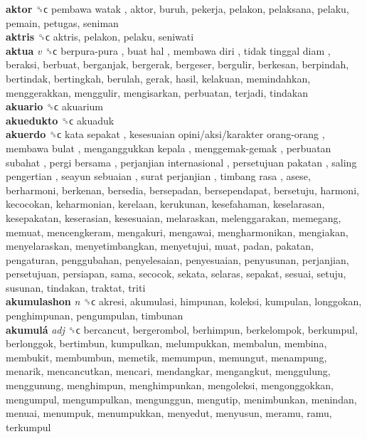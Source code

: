 \textbf{aktor} ␝ϲ   pembawa watak , aktor, buruh, pekerja, pelakon, pelaksana, pelaku, pemain, petugas, seniman  \\
\textbf{aktris} ␝ϲ  aktris, pelakon, pelaku, seniwati  \\
\textbf{aktua} \emph{v}  ␝ϲ   berpura-pura ,  buat hal ,  membawa diri ,  tidak tinggal diam , beraksi, berbuat, berganjak, bergerak, bergeser, bergulir, berkesan, berpindah, bertindak, bertingkah, berulah, gerak, hasil, kelakuan, memindahkan, menggerakkan, menggulir, mengisarkan, perbuatan, terjadi, tindakan  \\
\textbf{akuario} ␝ϲ  akuarium  \\
\textbf{akuedukto} ␝ϲ  akuaduk  \\
\textbf{akuerdo} ␝ϲ   kata sepakat ,  kesesuaian opini/aksi/karakter orang-orang ,  membawa bulat ,  menganggukkan kepala ,  menggemak-gemak ,  perbuatan subahat ,  pergi bersama ,  perjanjian internasional ,  persetujuan pakatan ,  saling pengertian ,  seayun sebuaian ,  surat perjanjian ,  timbang rasa , asese, berharmoni, berkenan, bersedia, bersepadan, bersependapat, bersetuju, harmoni, kecocokan, keharmonian, kerelaan, kerukunan, kesefahaman, keselarasan, kesepakatan, keserasian, kesesuaian, melaraskan, melenggarakan, memegang, memuat, mencengkeram, mengakuri, mengawai, mengharmonikan, mengiakan, menyelaraskan, menyetimbangkan, menyetujui, muat, padan, pakatan, pengaturan, penggubahan, penyelesaian, penyesuaian, penyusunan, perjanjian, persetujuan, persiapan, sama, secocok, sekata, selaras, sepakat, sesuai, setuju, susunan, tindakan, traktat, triti  \\
\textbf{akumulashon} \emph{n}  ␝ϲ  akresi, akumulasi, himpunan, koleksi, kumpulan, longgokan, penghimpunan, pengumpulan, timbunan  \\
\textbf{akumulá} \emph{adj}  ␝ϲ  bercancut, bergerombol, berhimpun, berkelompok, berkumpul, berlonggok, bertimbun, kumpulkan, melumpukkan, membalun, membina, membukit, membumbun, memetik, memumpun, memungut, menampung, menarik, mencancutkan, mencari, mendangkar, mengangkut, menggulung, menggunung, menghimpun, menghimpunkan, mengoleksi, mengonggokkan, mengumpul, mengumpulkan, mengunggun, mengutip, menimbunkan, menindan, menuai, menumpuk, menumpukkan, menyedut, menyusun, meramu, ramu, terkumpul  \\

